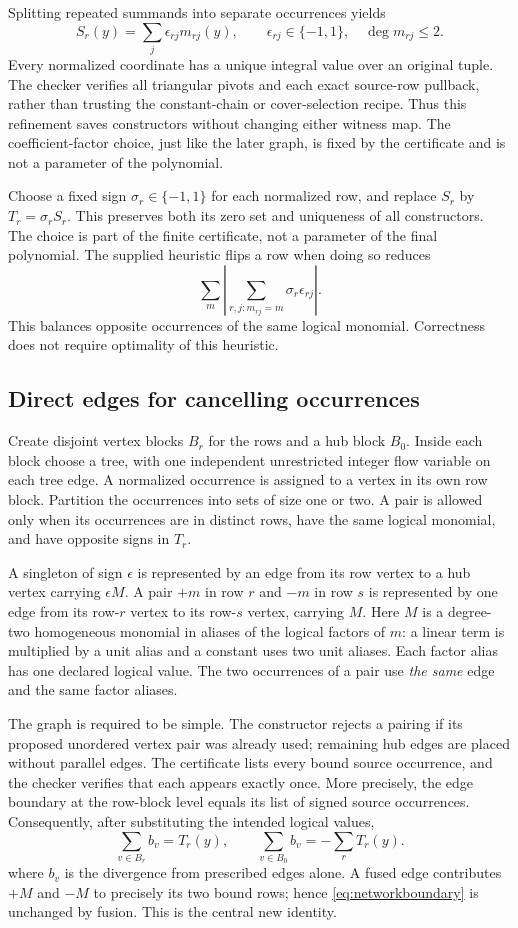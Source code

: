 Splitting repeated summands into separate occurrences yields
\[
 S_r(y)=\sum_j\epsilon_{rj}m_{rj}(y),\qquad \epsilon_{rj}\in\{-1,1\},
 \quad \deg m_{rj}\le2.
\]
Every normalized coordinate has a unique integral value over an original
tuple. The checker verifies all triangular pivots and each exact source-row
pullback, rather than trusting the constant-chain or cover-selection
recipe. Thus this refinement saves constructors without changing either
witness map. The coefficient-factor choice, just like the later graph,
is fixed by the certificate and is not a parameter of the polynomial.

Choose a fixed sign $\sigma_r\in\{-1,1\}$ for each normalized row, and
replace $S_r$ by $T_r=\sigma_rS_r$. This preserves both its zero set and
uniqueness of all constructors. The choice is part of the finite
certificate, not a parameter of the final polynomial. The supplied
heuristic flips a row when doing so reduces
\[
 \sum_m\left|\sum_{r,j:m_{rj}=m}\sigma_r\epsilon_{rj}\right|.
\]
This balances opposite occurrences of the same logical monomial.
Correctness does not require optimality of this heuristic.

\subsection{Direct edges for cancelling occurrences}
Create disjoint vertex blocks $B_r$ for the rows and a hub block $B_0$.
Inside each block choose a tree, with one independent unrestricted integer
flow variable on each tree edge. A normalized occurrence is assigned to a
vertex in its own row block. Partition the occurrences into sets of size
one or two. A pair is allowed only when its occurrences are in distinct
rows, have the same logical monomial, and have opposite signs in $T_r$.

A singleton of sign $\epsilon$ is represented by an edge from its row
vertex to a hub vertex carrying $\epsilon M$. A pair $+m$ in row $r$ and
$-m$ in row $s$ is represented by one edge from its row-$r$ vertex to its
row-$s$ vertex, carrying $M$. Here $M$ is a degree-two homogeneous
monomial in aliases of the logical factors of $m$: a linear term is
multiplied by a unit alias and a constant uses two unit aliases. Each factor
alias has one declared logical value. The two occurrences of a pair use
\emph{the same} edge and the same factor aliases.

The graph is required to be simple. The constructor rejects a pairing if
its proposed unordered vertex pair was already used; remaining hub edges
are placed without parallel edges. The certificate lists every bound
source occurrence, and the checker verifies that each appears exactly
once. More precisely, the edge boundary at the row-block level equals its
list of signed source occurrences. Consequently, after substituting the
intended logical values,
\begin{equation}\label{eq:networkboundary}
 \sum_{v\in B_r} b_v=T_r(y),\qquad
 \sum_{v\in B_0} b_v=-\sum_rT_r(y).
\end{equation}
where $b_v$ is the divergence from prescribed edges alone. A fused edge
contributes $+M$ and $-M$ to precisely its two bound rows; hence \eqref{eq:networkboundary} is
unchanged by fusion. This is the central new identity.

